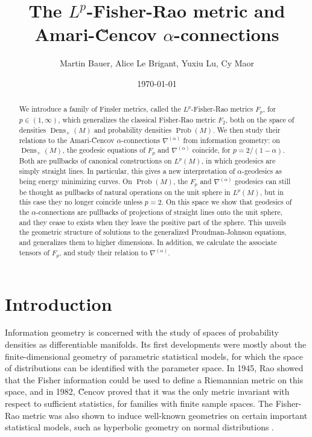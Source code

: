 \documentclass[11pt]{amsart}
\title{The $L^p$-Fisher-Rao metric and Amari-\u{C}encov $\alpha$-connections}
\author[]
{Martin Bauer, Alice Le Brigant, Yuxiu Lu, Cy Maor}
\date{\today}
\theoremstyle{definition}
\newcommand{\Prob}{\operatorname{Prob}(M)}
\newcommand{\Dens}{\operatorname{Dens}_+(M)}
\begin{document}
\begin{abstract}
We introduce a family of Finsler metrics, called the $L^p$-Fisher-Rao metrics $F_p$, for $p\in (1,\infty)$, which generalizes the classical Fisher-Rao metric $F_2$, both on the space of densities $\Dens$ and probability densities $\Prob$. 
We then study their relations to the Amari-\u{C}encov $\alpha$-connections $\nabla^{(\alpha)}$ from information geometry: on $\Dens$, the geodesic equations of $F_p$ and $\nabla^{(\alpha)}$ coincide, for $p = 2/(1-\alpha)$. 
Both are pullbacks of canonical constructions on $L^p(M)$, in which geodesics are simply straight lines.
In particular, this gives a new interpretation of $\alpha$-geodesics as being energy minimizing curves.
On $\Prob$, the $F_p$ and $\nabla^{(\alpha)}$ geodesics can still be thought as pullbacks of natural operations on the unit sphere in $L^p(M)$, but in this case they no longer coincide unless $p=2$. On this space we show that geodesics of the $\alpha$-connections are pullbacks of projections of straight lines onto the unit sphere, 
and they cease to exists when they leave the positive part of the sphere. 
This unveils the geometric structure of solutions to the  generalized Proudman-Johnson equations, and generalizes them to higher dimensions.
In addition, we calculate the associate tensors of $F_p$, and study their relation to $\nabla^{(\alpha)}$.
\end{abstract}

\maketitle

\setcounter{tocdepth}{1}
\tableofcontents


\section{Introduction}
Information geometry is concerned with the study of spaces of probability densities as differentiable manifolds. Its first developments were mostly about the finite-dimensional geometry of parametric statistical models, for which the space of distributions can be identified with the parameter space. In 1945, Rao \cite{rao1945} showed that the Fisher information could be used to define a Riemannian metric on this space, and in 1982, \u{C}encov \cite{cencov1982} proved that it was the only metric invariant with respect to sufficient statistics, for families with finite sample spaces. The Fisher-Rao metric was also shown to induce well-known geometries on certain important statistical models, such as hyperbolic geometry on normal distributions \cite{atkinson1981}. 
\end{document}
